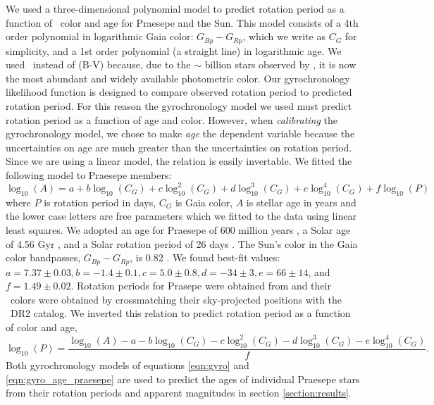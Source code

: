 We used a three-dimensional polynomial model to predict rotation period as a
function of \gaia\ color and age for Praesepe and the Sun.
This model consists of a 4th order polynomial in logarithmic Gaia color:
$G_{Bp} - G_{Rp}$, which we write as $C_G$ for simplicity, and a 1st order
polynomial (a straight line) in logarithmic age.
We used \gcolor\ instead of (B-V) because, due to the $\sim$ billion stars
observed by \gaia, it is now the most abundant and widely available
photometric color.
Our gyrochronology likelihood function is designed to compare observed
rotation period to predicted rotation period.
For this reason the gyrochronology model we used must predict rotation period
as a function of age and color.
However, when {\it calibrating} the gyrochronology model, we chose to make
{\it age} the dependent variable because the uncertainties on age are much
greater than the uncertainties on rotation period.
Since we are using a linear model, the relation is easily invertable.
We fitted the following model to Praesepe members:
\begin{equation}
    \log_{10}(A) = a + b\log_{10}(C_G) + c\log_{10}^2(C_G) +
    d\log_{10}^3(C_G) + e\log_{10}^4(C_G) + f\log_{10}(P)
\label{eqn:gyro_age_praesepe}
\end{equation}
where $P$ is rotation period in days, $C_G$ is Gaia color, $A$ is stellar age
in years and the lower case letters are free parameters which we fitted to the
data using linear least squares.
We adopted an age for Praesepe of 600 million years \citep{gossage2018}, a
Solar age of 4.56 Gyr \citep{connelly2012}, and a Solar rotation period of 26
days \citep[][Morris \etal, in prep]{balthasar1986, howe2000}.
The Sun's color in the Gaia color bandpasses, $G_{Bp} - G_{Rp}$, is 0.82
\citep{casagrande2018}.
We found best-fit values: $a = 7.37 \pm 0.03, b = -1.4 \pm 0.1, c = 5.0 \pm
0.8, d = -34 \pm 3, e = 66 \pm 14$, and $f = 1.49 \pm 0.02$.
Rotation periods for Prasepe were obtained from \citet{rebull2017} and their
\gaia\ colors were obtained by crossmatching their sky-projected positions
with the \gaia\ DR2 catalog.
We inverted this relation to predict rotation period as a function of color
and age,
\begin{equation}
    \log_{10}(P) = \frac{\log_{10}(A) - a - b\log_{10}(C_G) - c\log_{10}^2(C_G) -
    d\log_{10}^3(C_G) - e\log_{10}^4(C_G)}{f}.
\label{eqn:gyro_age_praesepe}
\end{equation}
Both gyrochronology models of equations \ref{eqn:gyro} and
\ref{eqn:gyro_age_praesepe} are used to predict the ages of individual
Praesepe stars from their rotation periods and apparent magnitudes in section
\ref{section:results}.
